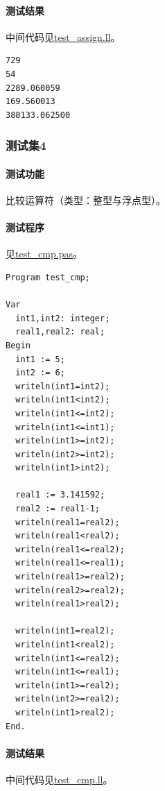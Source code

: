\documentclass[lang=cn,11pt,a4paper,cite=authornum]{paper}
\begin{document}
\paragraph{测试结果} 中间代码见\href{run:../test/test_assign.ll}{test\_assign.ll}。

\begin{code}
    \begin{verbatim}
729
54
2289.060059
169.560013
388133.062500
\end{verbatim}
\end{code}

\subsubsection{测试集4}

\paragraph{测试功能} 比较运算符（类型：整型与浮点型）。

\paragraph{测试程序} 见\href{run:../test/test_cmp.pas}{test\_cmp.pas}。

\begin{code}
    \begin{verbatim}
Program test_cmp;

Var 
  int1,int2: integer;
  real1,real2: real;
Begin
  int1 := 5;
  int2 := 6;
  writeln(int1=int2);
  writeln(int1<int2);
  writeln(int1<=int2);
  writeln(int1<=int1);
  writeln(int1>=int2);
  writeln(int2>=int2);
  writeln(int1>int2);

  real1 := 3.141592;
  real2 := real1-1;
  writeln(real1=real2);
  writeln(real1<real2);
  writeln(real1<=real2);
  writeln(real1<=real1);
  writeln(real1>=real2);
  writeln(real2>=real2);
  writeln(real1>real2);

  writeln(int1=real2);
  writeln(int1<real2);
  writeln(int1<=real2);
  writeln(int1<=real1);
  writeln(int1>=real2);
  writeln(int2>=real2);
  writeln(int1>real2);
End.

\end{verbatim}
\end{code}

\paragraph{测试结果} 中间代码见\href{run:../test/test_cmp.ll}{test\_cmp.ll}。
\end{document}
